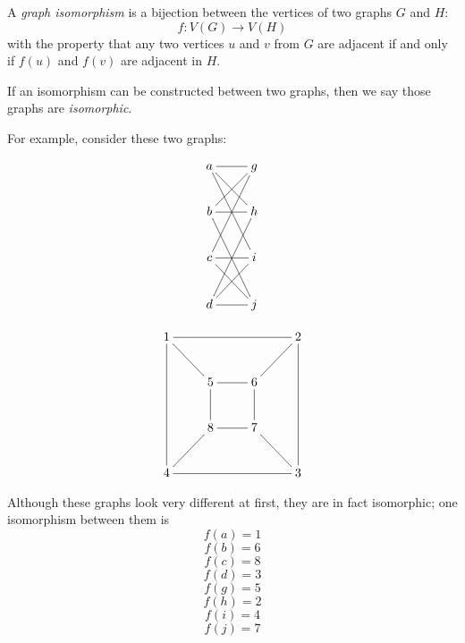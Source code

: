 \documentclass{article}
\begin{document}
A \emph{graph isomorphism} is a bijection between the vertices of two graphs $G$ and $H$:
$$f: V(G) \rightarrow V(H)$$
with the property that any two vertices $u$ and $v$ from $G$ are adjacent if and only if $f(u)$ and $f(v)$ are adjacent in $H$.

If an isomorphism can be constructed between two graphs, then we say those graphs are \emph{isomorphic}.

For example, consider these two graphs:

$$\xymatrix{
a \ar@{-}[r] \ar@{-}[rd] \ar@{-}[rdd] & g \\
b \ar@{-}[ru] \ar@{-}[r] \ar@{-}[rdd] & h \\
c \ar@{-}[ruu] \ar@{-}[r] \ar@{-}[rd] & i \\
d \ar@{-}[ruu] \ar@{-}[ru] \ar@{-}[r] & j}$$

$$\xymatrix{
1 \ar@{-}[rrr] \ar@{-}[rd] \ar@{-}[ddd] & & & 2 \\
& 5 & 6 \ar@{-}[ur] \ar@{-}[l] \ar@{-}[d] & \\
& 8 \ar@{-}[u] \ar@{-}[r] \ar@{-}[dl] & 7 & \\
4 & & & 3 \ar@{-}[uuu] \ar@{-}[lll] \ar@{-}[ul] }$$

Although these graphs look very different at first, they are in fact isomorphic; one isomorphism between them is
$$f(a) = 1$$
$$f(b) = 6$$
$$f(c) = 8$$
$$f(d) = 3$$
$$f(g) = 5$$
$$f(h) = 2$$
$$f(i) = 4$$
$$f(j) = 7$$
\end{document}
